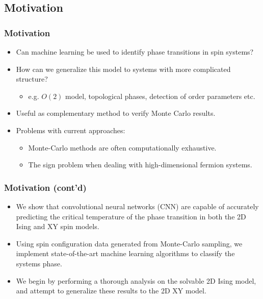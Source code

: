 \documentclass{beamer}
\begin{document}
\subsection{Motivation} %
\begin{frame}
\frametitle{Motivation}
	\begin{itemize}
		\item Can machine learning be used to identify phase transitions in spin systems?
		\item How can we generalize this model to systems with more complicated structure?
			\begin{itemize}
				\item e.g. $O(2)$ model, topological phases, detection of order parameters etc.
			\end{itemize}
		\item Useful as complementary method to verify Monte Carlo results.
		\item Problems with current approaches:
			\begin{itemize}
				\item Monte-Carlo methods are often computationally exhaustive.
				\item The sign problem when dealing with high-dimensional fermion systems.
			\end{itemize}
	\end{itemize}
\end{frame}


\begin{frame}
\frametitle{Motivation (cont'd)}
	\begin{itemize}
		\item We show that convolutional neural networks (CNN) are capable of accurately predicting the critical temperature of the phase transition in both the 2D Ising and XY spin models.
		\item Using spin configuration data generated from Monte-Carlo sampling, we implement state-of-the-art machine learning algorithms to classify the systems phase.
		\item We begin by performing a thorough analysis on the solvable 2D Ising model, and attempt to generalize these results to the 2D XY model.
	\end{itemize}
\end{frame}
\end{document}
